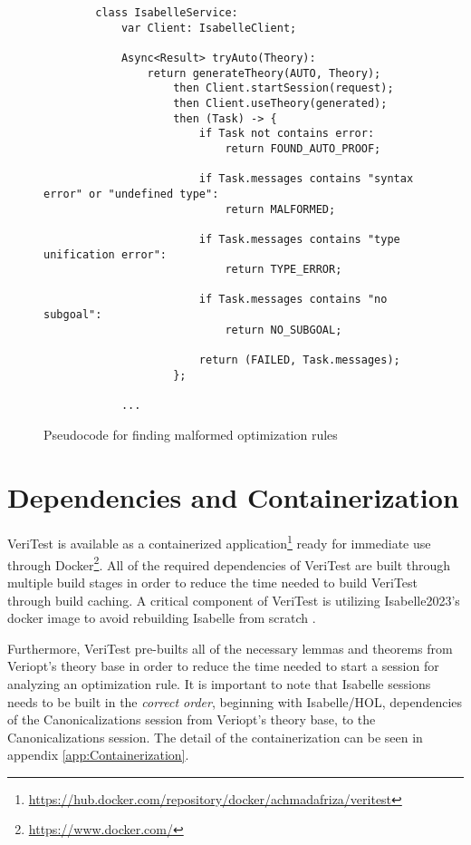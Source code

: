 \begin{figure}[!htb]
    \begin{lstlisting}
        class IsabelleService:
            var Client: IsabelleClient;
            
            Async<Result> tryAuto(Theory):
                return generateTheory(AUTO, Theory);
                    then Client.startSession(request);
                    then Client.useTheory(generated);
                    then (Task) -> {
                        if Task not contains error:
                            return FOUND_AUTO_PROOF;

                        if Task.messages contains "syntax error" or "undefined type":
                            return MALFORMED;
                        
                        if Task.messages contains "type unification error":
                            return TYPE_ERROR;

                        if Task.messages contains "no subgoal":
                            return NO_SUBGOAL;
                        
                        return (FAILED, Task.messages);
                    };
            
            ...
    \end{lstlisting}

    \caption{Pseudocode for finding malformed optimization rules}
    \label{fig:malformedPseudocode}
\end{figure}

\section{Dependencies and Containerization}
\label{sec:Containerization}

VeriTest is available as a containerized application\footnote{\href{https://hub.docker.com/repository/docker/achmadafriza/veritest}{https://hub.docker.com/repository/docker/achmadafriza/veritest}} 
ready for immediate use through Docker\footnote{\href{https://www.docker.com/}{https://www.docker.com/}}. All of the required dependencies of VeriTest are built through multiple build 
stages in order to reduce the time needed to build VeriTest through build caching. A critical component of VeriTest is utilizing Isabelle2023's docker 
image to avoid rebuilding Isabelle from scratch \cite[Sec. 7.1]{isabelleSystem}.

Furthermore, VeriTest pre-builts all of the necessary lemmas and 
theorems from Veriopt's theory base in order to reduce the time needed to start a session for analyzing an optimization rule. It is important to note 
that Isabelle sessions needs to be built in the \emph{correct order}, beginning with Isabelle/HOL, dependencies of the Canonicalizations session from 
Veriopt's theory base, to the Canonicalizations session. The detail of the containerization can be seen in appendix \ref{app:Containerization}.

